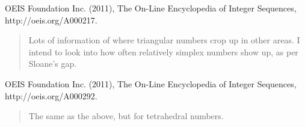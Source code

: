 \documentclass{article}
\begin{document}
 OEIS Foundation Inc. (2011), The On-Line Encyclopedia of Integer Sequences, http://oeis.org/A000217.
\begin{quote}
Lots of information of where triangular numbers crop up in other areas. I intend to look into how often relatively simplex numbers show up, as per Sloane's gap.
\end{quote}\vspace{5 mm}

 OEIS Foundation Inc. (2011), The On-Line Encyclopedia of Integer Sequences, http://oeis.org/A000292.
\begin{quote}
The same as the above, but for tetrahedral numbers.
\end{quote}
\end{document}
